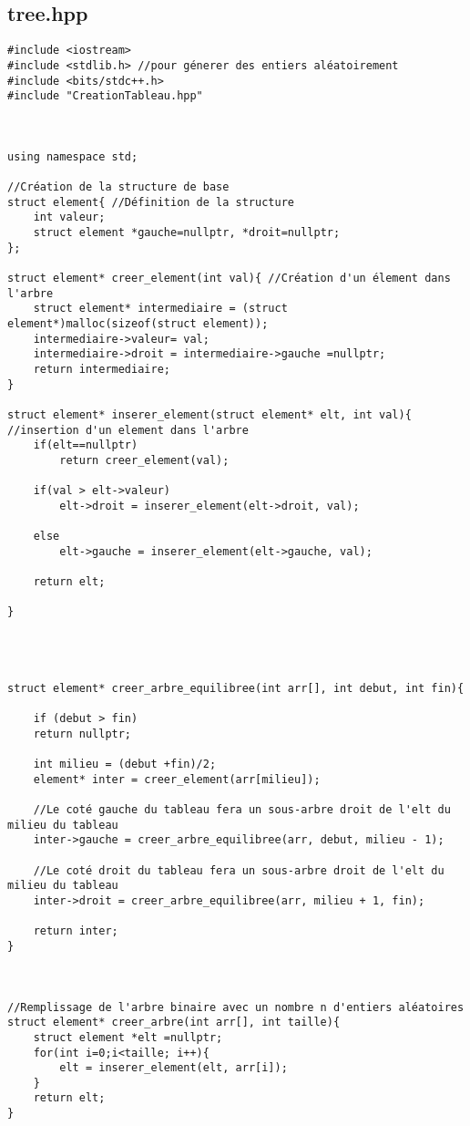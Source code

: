 \subsection{tree.hpp}
\begin{verbatim}
#include <iostream>
#include <stdlib.h> //pour génerer des entiers aléatoirement
#include <bits/stdc++.h>
#include "CreationTableau.hpp"



using namespace std;

//Création de la structure de base
struct element{ //Définition de la structure
    int valeur;
    struct element *gauche=nullptr, *droit=nullptr; 
};

struct element* creer_element(int val){ //Création d'un élement dans l'arbre 
    struct element* intermediaire = (struct element*)malloc(sizeof(struct element));
    intermediaire->valeur= val;
    intermediaire->droit = intermediaire->gauche =nullptr;
    return intermediaire;
}

struct element* inserer_element(struct element* elt, int val){ //insertion d'un element dans l'arbre
    if(elt==nullptr)
        return creer_element(val);

    if(val > elt->valeur)
        elt->droit = inserer_element(elt->droit, val);

    else
        elt->gauche = inserer_element(elt->gauche, val);

    return elt;

}




struct element* creer_arbre_equilibree(int arr[], int debut, int fin){
    
    if (debut > fin)
    return nullptr;

    int milieu = (debut +fin)/2;
    element* inter = creer_element(arr[milieu]);

    //Le coté gauche du tableau fera un sous-arbre droit de l'elt du milieu du tableau 
    inter->gauche = creer_arbre_equilibree(arr, debut, milieu - 1);
 
    //Le coté droit du tableau fera un sous-arbre droit de l'elt du milieu du tableau 
    inter->droit = creer_arbre_equilibree(arr, milieu + 1, fin);
 
    return inter;
}



//Remplissage de l'arbre binaire avec un nombre n d'entiers aléatoires
struct element* creer_arbre(int arr[], int taille){
    struct element *elt =nullptr;
    for(int i=0;i<taille; i++){
        elt = inserer_element(elt, arr[i]);
    }
    return elt;
}



\end{verbatim}
